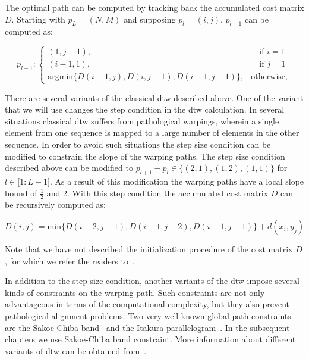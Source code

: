 The optimal path can be computed by tracking back the accumulated cost matrix $D$. Starting with $p_L = (N,M)$ and supposing $p_l = (i,j)$, $p_{l-1}$ can be computed as:

\begin{equation}
	p_{l-1} : \begin{cases}
	(1, j-1), & \quad \text{if } i=1\\
	(i-1, 1), & \quad \text{if } j=1\\	
	\mathrm{argmin} \lbrace D(i-1,j), D(i,j-1), D(i-1,j-1)\rbrace, & \mathrm{otherwise},
	\end{cases}
\end{equation}

There are several variants of the classical \gls{dtw} described above. One of the variant that we will use changes the step condition in the \gls{dtw} calculation. In several situations classical \gls{dtw} suffers from pathological warpings, wherein a single element from one sequence is mapped to a large number of elements in the other sequence. In order to avoid such situations the step size condition can be modified to constrain the slope of the warping paths. The step size condition described above can be modified to $p_{l+1}-p_l \in \lbrace (2,1), (1,2), (1,1) \rbrace$ for $l \in \lbrack 1: L-1 \rbrack$. As a result of this modification the warping paths have a local slope bound of $\frac{1}{2}$ and 2. With this step condition the accumulated cost matrix $D$ can be recursively computed as:

\begin{equation}
\label{eq:dtw_local_constraint_cost_matrix_computation}
D(i,j) = \mathrm{min} \lbrace D(i-2,j-1), D(i-1,j-2), D(i-1,j-1)\rbrace + d(x_i, y_j)
\end{equation}

Note that we have not described the initialization procedure of the cost matrix $D$, for which we refer the readers to~\citep{muller2007dynamic}.

In addition to the step size condition, another variants of the \gls{dtw} impose several kinds of constraints on the warping path. Such constraints are not only advantageous in terms of the computational complexity, but they also prevent pathological alignment problems. Two very well known global path constraints are the Sakoe-Chiba band~\citep{Sakoe78TASLP} and the Itakura parallelogram~\citep{itakura1975minimum}. In the subsequent chapters we use Sakoe-Chiba band constraint. More information about different variants of \gls{dtw} can be obtained from~\citep{rabiner1993fundamentals,muller2007dynamic}.

